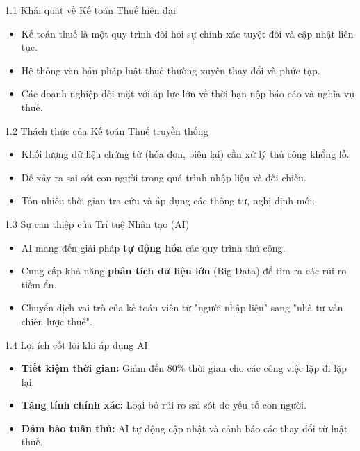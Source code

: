 \documentclass[aspectratio=169]{beamer}
\begin{document}
\begin{frame}{1.1 Khái quát về Kế toán Thuế hiện đại}
    \begin{itemize}
        \item Kế toán thuế là một quy trình đòi hỏi sự chính xác tuyệt đối và cập nhật liên tục.
        \item Hệ thống văn bản pháp luật thuế thường xuyên thay đổi và phức tạp.
        \item Các doanh nghiệp đối mặt với áp lực lớn về thời hạn nộp báo cáo và nghĩa vụ thuế.
    \end{itemize}
\end{frame}


\begin{frame}{1.2 Thách thức của Kế toán Thuế truyền thống}
    \begin{itemize}
        \item Khối lượng dữ liệu chứng từ (hóa đơn, biên lai) cần xử lý thủ công khổng lồ.
        \item Dễ xảy ra sai sót con người trong quá trình nhập liệu và đối chiếu.
        \item Tốn nhiều thời gian tra cứu và áp dụng các thông tư, nghị định mới.
    \end{itemize}
\end{frame}


\begin{frame}{1.3 Sự can thiệp của Trí tuệ Nhân tạo (AI)}
    \begin{itemize}
        \item AI mang đến giải pháp \textbf{tự động hóa} các quy trình thủ công.
        \item Cung cấp khả năng \textbf{phân tích dữ liệu lớn} (Big Data) để tìm ra các rủi ro tiềm ẩn.
        \item Chuyển dịch vai trò của kế toán viên từ "người nhập liệu" sang "nhà tư vấn chiến lược thuế".
    \end{itemize}
\end{frame}


\begin{frame}{1.4 Lợi ích cốt lõi khi áp dụng AI}
    \begin{itemize}
        \item \textbf{Tiết kiệm thời gian:} Giảm đến 80\% thời gian cho các công việc lặp đi lặp lại.
        \item \textbf{Tăng tính chính xác:} Loại bỏ rủi ro sai sót do yếu tố con người.
        \item \textbf{Đảm bảo tuân thủ:} AI tự động cập nhật và cảnh báo các thay đổi từ luật thuế.
    \end{itemize}
\end{frame}
\end{document}
